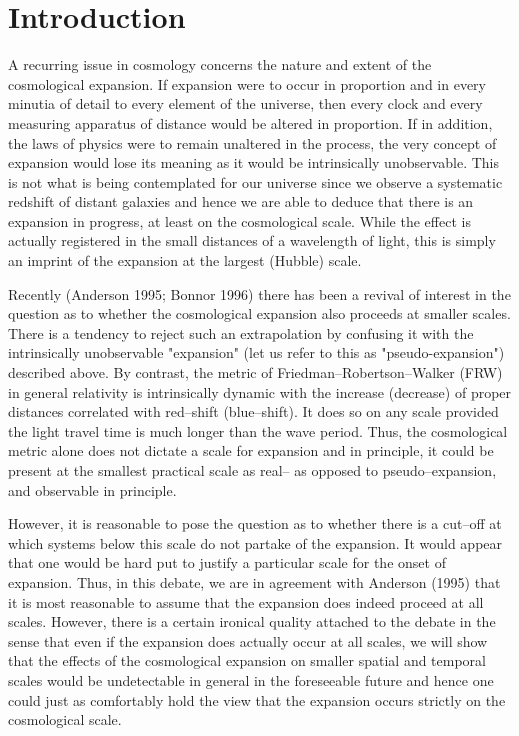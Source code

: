   \section{Introduction}
  
  A recurring issue in cosmology concerns the nature and extent of the
  cosmological expansion. If expansion were to occur in proportion and in
  every minutia of detail to every element of the universe, then 
  every clock and every measuring apparatus of distance would be 
  altered in proportion. If in addition, the laws of physics were to 
  remain unaltered in the process, the very concept of expansion would lose
  its meaning as it would be intrinsically unobservable. 
  This is not what is
  being contemplated for our universe since we observe a systematic redshift of
  distant galaxies and hence we
  are able to deduce that there is an expansion in progress, at least on the
  cosmological scale. While the effect is actually registered in the small 
  distances of a 
  wavelength of light, this is simply an imprint of the expansion at the 
  largest (Hubble) scale. 
     
  Recently (Anderson 1995; Bonnor 1996) there has been a revival of
  interest in the question as to whether the cosmological expansion also 
  proceeds at smaller scales. There is a tendency to reject such an 
  extrapolation by confusing it with the intrinsically unobservable "expansion"
  (let us refer to this as "pseudo-expansion") described above.
  By contrast, the metric of Friedman--Robertson--Walker (FRW) in
  general relativity is intrinsically dynamic with the increase (decrease)
  of proper distances correlated with red--shift (blue--shift). It does so
on any scale provided the light travel time is much longer than the wave
period. Thus, the cosmological metric alone does not dictate a scale for
expansion and in principle, it could be present at the smallest practical
scale as real--  as opposed to pseudo--expansion, and observable in principle.
  
However, it is reasonable to pose the question as to
   whether there is a cut--off at
which
  systems below this scale do not partake of the expansion. It would
appear that
  one would be hard put to justify a particular scale for the onset of
expansion. 
         Thus, in this debate, we are in agreement with Anderson (1995) 
  that it is most
  reasonable to assume that the expansion does indeed proceed at all scales.
  However, there is a certain ironical quality attached to the debate in the
  sense that even if the expansion does actually occur at all scales, we will
  show that the effects of the cosmological expansion on smaller spatial and
  temporal scales would be undetectable in general in the foreseeable 
  future and hence one could just as comfortably hold the view that the 
  expansion occurs strictly on the cosmological scale. 
  
